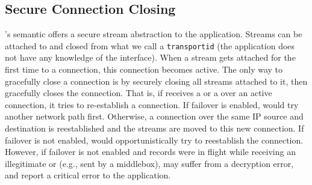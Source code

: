 \subsection{Secure Connection Closing}
\tcpls's semantic offers a secure stream abstraction to the application.
Streams can be attached to and closed from what we call a \texttt{transportid}
(the application does not have any knowledge of the \tcp interface). When a
stream gets attached for the first time to a \tcp connection, this connection
becomes active. The only way to gracefully close a \tcp connection is by securely closing all streams attached to it, then \tcpls gracefully closes the \tcp connection. That is, if \tcpls receives a \rst or a \fin over an active \tcp connection, it tries to re-establish a \tcp connection. If failover is enabled, \tcpls would try another network path first. Otherwise, a connection over the same IP source and destination is reestablished and the streams are moved to this new \tcp connection. If failover is not enabled, \tcpls would opportunistically try to reestablish the connection. However, if failover is not enabled and records were in flight while receiving an illegitimate \rst or \fin (e.g., sent by a middlebox), \tcpls may suffer from a decryption error, and report a critical error to the application.
